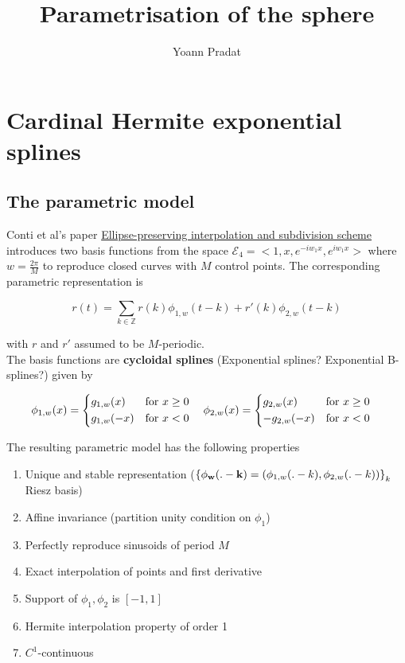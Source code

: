 \documentclass[a4paper, 11pt]{article}
\begin{document}
\title{Parametrisation of the sphere}
\author{Yoann Pradat}
\maketitle

\section{Cardinal Hermite exponential splines}

\subsection{The parametric model}

Conti et al's paper \underline{Ellipse-preserving interpolation and subdivision scheme} introduces two basis functions 
from the space $\mathcal{E}_4 = <1, x, e^{-iw_1x}, e^{iw_1x}>$ where $w = \frac{2\pi}{M}$ to reproduce closed curves 
with $M$ control points. The corresponding parametric representation is 

\begin{equation}
  r(t) = \sum_{k \in \mathbb{Z}} r(k) \phi_{1,w}(t-k) + r'(k) \phi_{2, w}(t-k)
\end{equation}

with $r$ and $r'$ assumed to be $M$-periodic. \\

The basis functions are \textbf{cycloidal splines} (Exponential splines? Exponential B-splines?) given by

\begin{equation}
  \phi_{1, w}(x) =
  \begin{dcases}
    g_{1, w}(x) &\text{for } x \geq 0 \\
    g_{1, w}(-x) &\text{for } x < 0\\
  \end{dcases} \quad
  \hfill
  \phi_{2, w}(x) =
  \begin{dcases}
    g_{2, w}(x) &\text{for } x \geq 0 \\
    -g_{2, w}(-x) &\text{for } x < 0\\
  \end{dcases} \quad
\end{equation}


The resulting parametric model has the following properties
\begin{enumerate}
  \item Unique and stable representation (${\{{\bf \phi_w(.-k)} = (\phi_{1,w}(.-k), \phi_{2,w}(.-k))\}}_{k}$ Riesz 
    basis)
  \item Affine invariance (partition unity condition on  $\phi_1$)
  \item Perfectly reproduce sinusoids of period $M$
  \item Exact interpolation of points and first derivative
  \item Support of $\phi_1, \phi_2$ is $[-1, 1]$
  \item Hermite interpolation property of order 1
  \item $C^1$-continuous
\end{enumerate}
\end{document}
